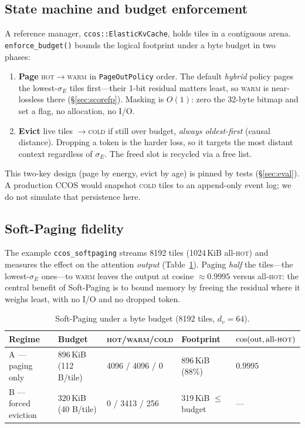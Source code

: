 \documentclass[11pt]{article}
\theoremstyle{plain}
\theoremstyle{definition}
\newcommand{\sigE}{\sigma_E}
\begin{document}
\subsection{State machine and budget enforcement}
A reference manager, \texttt{ccos::ElasticKvCache}, holds tiles in a
contiguous arena. \texttt{enforce\_budget()} bounds the logical footprint
under a byte budget in two phases:

\begin{enumerate}[leftmargin=1.6em,itemsep=2pt]
  \item \textbf{Page} \textsc{hot}$\to$\textsc{warm} in
    \texttt{PageOutPolicy} order. The default \emph{hybrid} policy pages
    the lowest-$\sigE$ tiles first---their 1-bit residual matters least,
    so \textsc{warm} is near-lossless there (\S\ref{sec:scorefp}).
    Masking is $O(1)$: zero the 32-byte bitmap and set a flag, no
    allocation, no I/O.
  \item \textbf{Evict} live tiles $\to$\textsc{cold} if still over
    budget, \emph{always oldest-first} (causal distance). Dropping a
    token is the harder loss, so it targets the most distant context
    regardless of $\sigE$. The freed slot is recycled via a free list.
\end{enumerate}

This two-key design (page by energy, evict by age) is pinned by tests
(\S\ref{sec:eval}). A production CCOS would snapshot \textsc{cold} tiles
to an append-only event log; we do not simulate that persistence here.

\subsection{Soft-Paging fidelity}
The example \texttt{ccos\_softpaging} streams 8192 tiles (1024\,KiB
all-\textsc{hot}) and measures the effect on the attention
\emph{output} (Table~\ref{tab:softpaging}). Paging \emph{half} the
tiles---the lowest-$\sigE$ ones---to \textsc{warm} leaves the output at
cosine $\approx 0.9995$ versus all-\textsc{hot}: the central benefit of
Soft-Paging is to bound memory by freeing the residual where it weighs
least, with no I/O and no dropped token.

\begin{table}[t]
\centering
\caption{Soft-Paging under a byte budget (8192 tiles, $d_v=64$).}
\label{tab:softpaging}
\small
\begin{tabular}{@{}lllll@{}}
\toprule
Regime & Budget & \textsc{hot}/\textsc{warm}/\textsc{cold} & Footprint & $\cos(\text{out}, \text{all-}\textsc{hot})$ \\
\midrule
A --- paging only      & 896\,KiB (112 B/tile) & 4096 / 4096 / 0    & 896\,KiB (88\%)      & $\mathbf{0.9995}$ \\
B --- forced eviction  & 320\,KiB (40 B/tile)  & 0 / 3413 / 256     & 319\,KiB $\le$ budget & --- \\
\bottomrule
\end{tabular}
\end{table}
\end{document}
